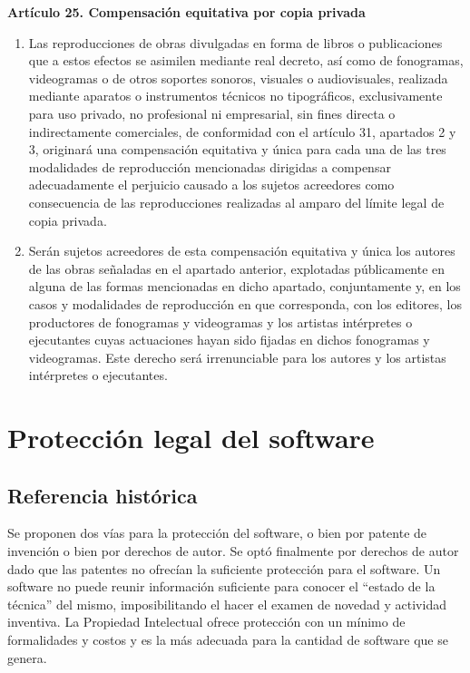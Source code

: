 \textbf{Artículo 25. Compensación equitativa por copia privada}
\begin{enumerate}[label=\textbf{\arabic*.}]
    \item Las reproducciones de obras divulgadas en forma de libros o publicaciones que a estos efectos se asimilen mediante real decreto, así como de fonogramas, videogramas o de otros soportes sonoros, visuales o audiovisuales, realizada mediante aparatos o instrumentos técnicos no tipográficos, exclusivamente para uso privado, no profesional ni empresarial, sin fines directa o indirectamente comerciales, de conformidad con el artículo 31, apartados 2 y 3, originará una compensación equitativa y única para cada una de las tres modalidades de reproducción mencionadas dirigidas a compensar adecuadamente el perjuicio causado a los sujetos acreedores como consecuencia de las reproducciones realizadas al amparo del límite legal de copia privada.
    \item Serán sujetos acreedores de esta compensación equitativa y única los autores de las obras señaladas en el apartado anterior, explotadas públicamente en alguna de las formas mencionadas en dicho apartado, conjuntamente y, en los casos y modalidades de reproducción en que corresponda, con los editores, los productores de fonogramas y videogramas y los artistas intérpretes o ejecutantes cuyas actuaciones hayan sido fijadas en dichos fonogramas y videogramas. Este derecho será irrenunciable para los autores y los artistas intérpretes o ejecutantes.
\end{enumerate}


\section{Protección legal del software}

\subsection{Referencia histórica}

Se proponen dos vías para la protección del software, o bien por patente de invención o bien por derechos de autor. Se optó finalmente por derechos de autor dado que las patentes no ofrecían la suficiente protección para el software. Un software no puede reunir información suficiente para conocer el ``estado de la técnica'' del mismo, imposibilitando el hacer el examen de novedad y actividad inventiva. La Propiedad Intelectual ofrece protección con un mínimo de formalidades y costos y es la más adecuada para la cantidad de software que se genera.

